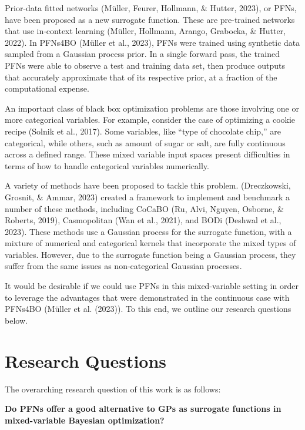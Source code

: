 \documentclass[12pt,twoside]{reedthesis}
\begin{document}
Prior-data fitted networks (Müller, Feurer, Hollmann, \& Hutter, 2023), or PFNs, have been proposed as a new surrogate function. These are pre-trained networks that use in-context learning (Müller, Hollmann, Arango, Grabocka, \& Hutter, 2022). In PFNs4BO (Müller et al., 2023), PFNs were trained using synthetic data sampled from a Gaussian process prior. In a single forward pass, the trained PFNs were able to observe a test and training data set, then produce outputs that accurately approximate that of its respective prior, at a fraction of the computational expense.

An important class of black box optimization problems are those involving one or more categorical variables. For example, consider the case of optimizing a cookie recipe (Solnik et al., 2017). Some variables, like ``type of chocolate chip,'' are categorical, while others, such as amount of sugar or salt, are fully continuous across a defined range. These mixed variable input spaces present difficulties in terms of how to handle categorical variables numerically.

A variety of methods have been proposed to tackle this problem. (Dreczkowski, Grosnit, \& Ammar, 2023) created a framework to implement and benchmark a number of these methods, including CoCaBO (Ru, Alvi, Nguyen, Osborne, \& Roberts, 2019), Casmopolitan (Wan et al., 2021), and BODi (Deshwal et al., 2023). These methods use a Gaussian process for the surrogate function, with a mixture of numerical and categorical kernels that incorporate the mixed types of variables. However, due to the surrogate function being a Gaussian process, they suffer from the same issues as non-categorical Gaussian processes.

It would be desirable if we could use PFNs in this mixed-variable setting in order to leverage the advantages that were demonstrated in the continuous case with PFNs4BO (Müller et al. (2023)). To this end, we outline our research questions below.

\hypertarget{researchQuestions}{%
\section{Research Questions}\label{researchQuestions}}

The overarching research question of this work is as follows:

\textbf{Do PFNs offer a good alternative to GPs as surrogate functions in mixed-variable Bayesian optimization?}
\end{document}
